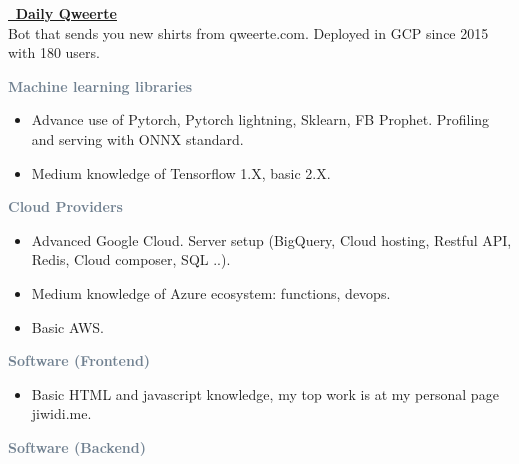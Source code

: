 \textcolor{SlateGrey}{\textbf{\href{https://github.com/jiwidi/DailyQwertee}{\faGithub \, Daily Qweerte}}} \\ 
Bot that sends you new shirts from qweerte.com. Deployed in GCP since 2015 with 180 users.
\newline
\vspace{1pt}





\textcolor{SlateGrey}{\textbf{Machine learning libraries}}
\newline

\begin{itemize}
    \item Advance use of Pytorch, Pytorch lightning, Sklearn, FB Prophet. Profiling and serving with ONNX standard.
    \item Medium knowledge of Tensorflow 1.X, basic 2.X.
\end{itemize}

\textcolor{SlateGrey}{\textbf{Cloud Providers}}
\newline

\begin{itemize}
    \item Advanced Google Cloud. Server setup (BigQuery, Cloud hosting, Restful API, Redis, Cloud composer, SQL ..).
    \item Medium knowledge of Azure ecosystem: functions, devops.
    \item Basic AWS.
\end{itemize}

\textcolor{SlateGrey}{\textbf{Software (Frontend)}}
\newline

\begin{itemize}
    \item Basic HTML and javascript knowledge, my top work is at my personal page jiwidi.me.
\end{itemize}

\textcolor{SlateGrey}{\textbf{Software (Backend)}}
\newline

